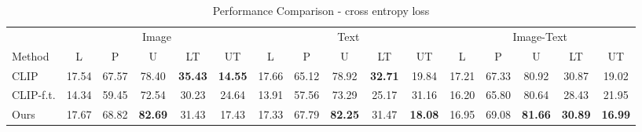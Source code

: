 \begin{table*}
    \centering
    \caption{Performance Comparison -  cross entropy loss}
    \label{tab: baselines2}

    \begin{tabular}{l|ccccc|ccccc|ccccc }
    \hline

             & \multicolumn{5}{c|}{Image} 
             & \multicolumn{5}{c|}{Text} 
             & \multicolumn{5}{c}{Image-Text} \\ 
        \cline{2-16}
             \cline{2-16}
        Method & L&P& U&LT& UT& L&P& U&LT& UT& L&P& U&LT& UT   \\ 
        \hline
        CLIP & 17.54 & 67.57 & 78.40 & \textbf{35.43} & \textbf{14.55} & 17.66 & 65.12 & 78.92 & \textbf{32.71} & 19.84 & 17.21 & 67.33 & 80.92 & 30.87 & 19.02  \\
        CLIP-f.t. & 14.34 & 59.45 & 72.54 & 30.23 & 24.64 & 13.91 & 57.56 & 73.29 & 25.17 & 31.16 & 16.20 & 65.80 & 80.64 & 28.43 & 21.95 \\
        Ours & 17.67 & 68.82 & \textbf{82.69} & 31.43 & 17.43 & 17.33 & 67.79 & \textbf{82.25} & 31.47 & \textbf{18.08} & 16.95 & 69.08 & \textbf{81.66} & \textbf{30.89} & \textbf{16.99}  \\
        
        \hline
        
    \end{tabular}    
\end{table*}

